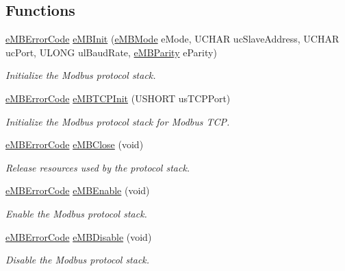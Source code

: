 \subsection*{Functions}
\begin{DoxyCompactItemize}
\item 
\hyperlink{group__modbus_ga9e7fce8c431cb0e521c67f7f36dd823d}{e\+M\+B\+Error\+Code} \hyperlink{group__modbus_ga622dbe6b38ff1d255523d4736fa3da26}{e\+M\+B\+Init} (\hyperlink{group__modbus_ga462d0d9396f02be6f9fd5b6f19463e61}{e\+M\+B\+Mode} e\+Mode, U\+C\+H\+AR uc\+Slave\+Address, U\+C\+H\+AR uc\+Port, U\+L\+O\+NG ul\+Baud\+Rate, \hyperlink{group__modbus_ga16ba85fa56bcd52a11a12576af445ccb}{e\+M\+B\+Parity} e\+Parity)
\begin{DoxyCompactList}\small\item\em Initialize the Modbus protocol stack. \end{DoxyCompactList}\item 
\hyperlink{group__modbus_ga9e7fce8c431cb0e521c67f7f36dd823d}{e\+M\+B\+Error\+Code} \hyperlink{group__modbus_gab06a2d0ef8bdfd866cd934f0ec7e7a6e}{e\+M\+B\+T\+C\+P\+Init} (U\+S\+H\+O\+RT us\+T\+C\+P\+Port)
\begin{DoxyCompactList}\small\item\em Initialize the Modbus protocol stack for Modbus T\+CP. \end{DoxyCompactList}\item 
\hyperlink{group__modbus_ga9e7fce8c431cb0e521c67f7f36dd823d}{e\+M\+B\+Error\+Code} \hyperlink{group__modbus_gac20080d92be2934456e2a5d27cd36310}{e\+M\+B\+Close} (void)
\begin{DoxyCompactList}\small\item\em Release resources used by the protocol stack. \end{DoxyCompactList}\item 
\hyperlink{group__modbus_ga9e7fce8c431cb0e521c67f7f36dd823d}{e\+M\+B\+Error\+Code} \hyperlink{group__modbus_gab697be370833d562e6b016626d996132}{e\+M\+B\+Enable} (void)
\begin{DoxyCompactList}\small\item\em Enable the Modbus protocol stack. \end{DoxyCompactList}\item 
\hyperlink{group__modbus_ga9e7fce8c431cb0e521c67f7f36dd823d}{e\+M\+B\+Error\+Code} \hyperlink{group__modbus_gabcc2a31ec41fc276ab3c3ac705defdf3}{e\+M\+B\+Disable} (void)
\begin{DoxyCompactList}\small\item\em Disable the Modbus protocol stack. \end{DoxyCompactList}\item 

\end{DoxyCompactItemize}
